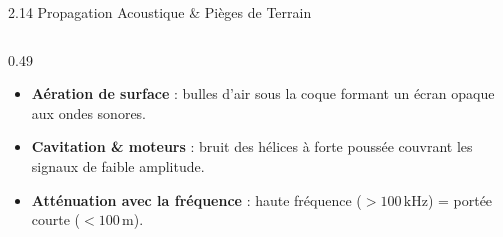 \begin{frame}{2.14 Propagation Acoustique \& Pièges de Terrain}
\begin{columns}[T]
\begin{column}{0.49\textwidth}
      \begin{block}{}
        \scriptsize
        \begin{itemize}
          \item \textbf{Aération de surface} : bulles d'air sous la coque formant un écran opaque aux ondes sonores.
          \item \textbf{Cavitation \& moteurs} : bruit des hélices à forte poussée couvrant les signaux de faible amplitude.
          \item \textbf{Atténuation avec la fréquence} : haute fréquence ($>100\,\text{kHz}$) = portée courte ($<100\,\text{m}$).
        \end{itemize}
      \end{block}
    \end{column}
  \end{columns}
\end{frame}
